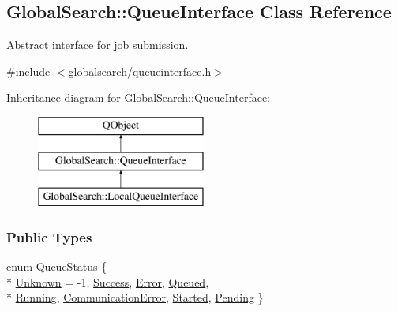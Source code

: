 \hypertarget{classGlobalSearch_1_1QueueInterface}{}\subsection{Global\+Search\+:\+:Queue\+Interface Class Reference}
\label{classGlobalSearch_1_1QueueInterface}


Abstract interface for job submission.  




{\ttfamily \#include $<$globalsearch/queueinterface.\+h$>$}

Inheritance diagram for Global\+Search\+:\+:Queue\+Interface\+:\begin{figure}[H]
\begin{center}
\leavevmode
\includegraphics[height=3.000000cm]{classGlobalSearch_1_1QueueInterface}
\end{center}
\end{figure}
\subsubsection*{Public Types}
\begin{DoxyCompactItemize}
\item 
enum \hyperlink{classGlobalSearch_1_1QueueInterface_a08dcf06d1b99f6333472470490ca9a6d}{Queue\+Status} \{ \\*
\hyperlink{classGlobalSearch_1_1QueueInterface_a08dcf06d1b99f6333472470490ca9a6da4960b69e5e05b425331bba80e5b59e20}{Unknown} = -\/1, 
\hyperlink{classGlobalSearch_1_1QueueInterface_a08dcf06d1b99f6333472470490ca9a6da4be480247388114f3860f7e746df65e9}{Success}, 
\hyperlink{classGlobalSearch_1_1QueueInterface_a08dcf06d1b99f6333472470490ca9a6dabaf3f4a536a56b3a2ac6643de3e4689f}{Error}, 
\hyperlink{classGlobalSearch_1_1QueueInterface_a08dcf06d1b99f6333472470490ca9a6da4c4e184400d3f455f263dc029217fc9a}{Queued}, 
\\*
\hyperlink{classGlobalSearch_1_1QueueInterface_a08dcf06d1b99f6333472470490ca9a6da46d29e0584d720fdb20334913c0a5822}{Running}, 
\hyperlink{classGlobalSearch_1_1QueueInterface_a08dcf06d1b99f6333472470490ca9a6da96ca4ddb429576d197eefe0e6b3a3a98}{Communication\+Error}, 
\hyperlink{classGlobalSearch_1_1QueueInterface_a08dcf06d1b99f6333472470490ca9a6dad54b02ac97bb4a875b105a31489f7aa7}{Started}, 
\hyperlink{classGlobalSearch_1_1QueueInterface_a08dcf06d1b99f6333472470490ca9a6da08ea952b51a67578345517c853e66801}{Pending}
 \}
\end{DoxyCompactItemize}
